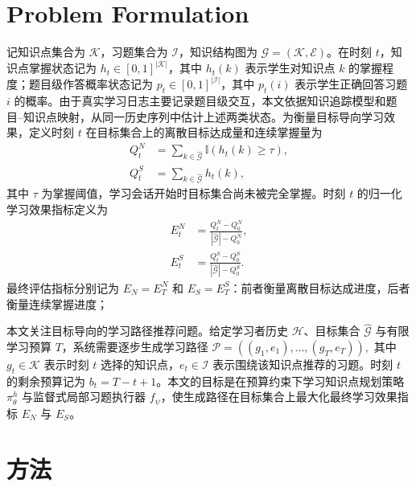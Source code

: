 \documentclass[11pt,a4paper]{article}
\begin{document}
\section{Problem Formulation}
记知识点集合为 $\mathcal{K}$，习题集合为 $\mathcal{I}$，知识结构图为 $\mathcal{G}=(\mathcal{K},\mathcal{E})$。在时刻 $t$，知识点掌握状态记为 $h_t\in[0,1]^{|\mathcal{K}|}$，其中 $h_t(k)$ 表示学生对知识点 $k$ 的掌握程度；题目级作答概率状态记为 $p_t\in[0,1]^{|\mathcal{I}|}$，其中 $p_t(i)$ 表示学生正确回答习题 $i$ 的概率。由于真实学习日志主要记录题目级交互，本文依据知识追踪模型和题目--知识点映射，从同一历史序列中估计上述两类状态\cite{liu2025deep}。为衡量目标导向学习效果，定义时刻 $t$ 在目标集合上的离散目标达成量和连续掌握量为
\begin{equation}
\begin{aligned}
Q_t^N &= \sum_{k\in\hat{\mathcal{G}}}
\mathbb{I}\!\left(h_t(k)\geq\tau\right),\\
Q_t^S &= \sum_{k\in\hat{\mathcal{G}}} h_t(k),
\end{aligned}
\end{equation}
其中 $\tau$ 为掌握阈值，学习会话开始时目标集合尚未被完全掌握。时刻 $t$ 的归一化学习效果指标定义为
\begin{equation}
\begin{aligned}
E_t^N &= \frac{Q_t^N-Q_0^N}{|\hat{\mathcal{G}}|-Q_0^N},\\
E_t^S &= \frac{Q_t^S-Q_0^S}{|\hat{\mathcal{G}}|-Q_0^S}.
\end{aligned}
\end{equation}
最终评估指标分别记为 $E_N=E_T^N$ 和 $E_S=E_T^S$：前者衡量离散目标达成进度，后者衡量连续掌握进度；

本文关注目标导向的学习路径推荐问题。给定学习者历史 $\mathcal{H}$、目标集合 $\hat{\mathcal{G}}$ 与有限学习预算 $T$，系统需要逐步生成学习路径
$
\mathcal{P}=((g_1,e_1),\dots,(g_T,e_T)),
$
其中 $g_t\in\mathcal{K}$ 表示时刻 $t$ 选择的知识点，$e_t\in\mathcal{I}$ 表示围绕该知识点推荐的习题。时刻 $t$ 的剩余预算记为 $b_t=T-t+1$。本文的目标是在预算约束下学习知识点规划策略 $\pi^h_\theta$ 与监督式局部习题执行器 $f_\psi$，使生成路径在目标集合上最大化最终学习效果指标 $E_N$ 与 $E_S$。

\section{方法}
\end{document}
